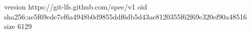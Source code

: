 version https://git-lfs.github.com/spec/v1
oid sha256:ae5f69ede7ef6a4948b0d9855ddf6db5d43ae8120355f62f69c320ef90a48516
size 6129
